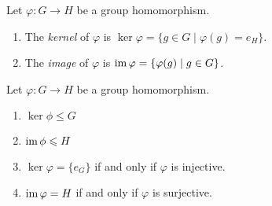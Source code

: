     \begin{definition}
        Let $\varphi:G \rightarrow H$ be a group homomorphism.
        \begin{enumerate}[label = (\arabic*),itemsep=1pt,topsep=3pt]
            \item The \textit{kernel} of $\varphi$ is $\ker \varphi = \{g \in G \mid \varphi(g) = e_H\}$.
            \item The \textit{image} of $\varphi$ is $\operatorname{im} \varphi = \{\varphi(g) \mid g \in G\}$.
        \end{enumerate}
    \end{definition}

    \begin{proposition}
        Let $\varphi:G \rightarrow H$ be a group homomorphism.
            \begin{enumerate}[label = (\arabic*),itemsep=1pt,topsep=3pt]
                \item $\ker \phi \leq G$
                \item $\operatorname{im} \phi \leqslant H$
                \item $\ker \varphi = \{e_G\}$ if and only if $\varphi$ is injective.
                \item $\operatorname{im} \varphi = H$ if and only if $\varphi$ is surjective.
            \end{enumerate}
    \end{proposition}
